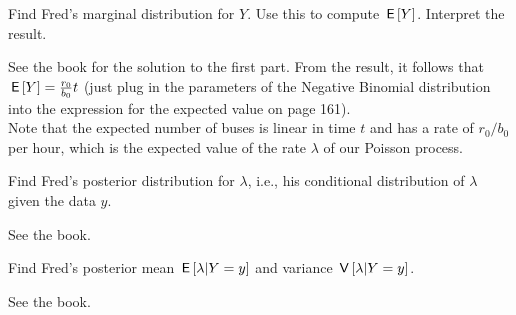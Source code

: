 \documentclass[lectures]{subfiles}
\begin{document}
\begin{exercise}
Find Fred's marginal distribution for $Y$. Use this to compute $\,\mathsf{E}\left[Y\right]$. Interpret the result.
\begin{solution}
See the book for the solution to the first part. From the result, it follows that $\,\mathsf{E}\left[Y\right] = \frac{r_0}{b_0} t$ (just plug in the parameters of the Negative Binomial distribution into the expression for the expected value on page 161).\\
Note that the expected number of buses is linear in time $t$ and has a rate of $r_0/b_0$ per hour, which is the expected value of the rate $\lambda$ of our Poisson process.
\end{solution}
\end{exercise}

\begin{exercise}
Find Fred's posterior distribution for $\lambda$, i.e., his conditional distribution of $\lambda$ given the data $y$.
\begin{solution}
See the book.
\end{solution}
\end{exercise}

\begin{exercise}
Find Fred's posterior mean $\,\mathsf{E}\left[\lambda | Y = y\right]$ and variance $\,\mathsf{V}\left[\lambda|Y=y\right]$.
\begin{solution}
See the book.
\end{solution}
\end{exercise}


\end{document}
